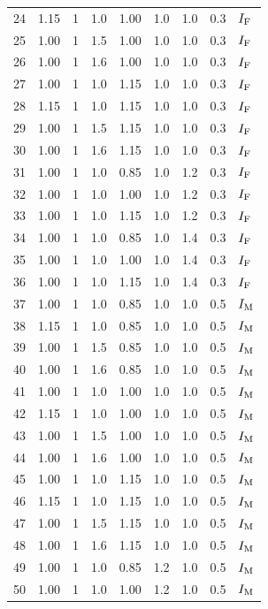 \begin{longtable}[t]{lllllllll}
24 & 1.15 & 1 & 1.0 & 1.00 & 1.0 & 1.0 & 0.3 & $I_{{\rm F}}$\\
25 & 1.00 & 1 & 1.5 & 1.00 & 1.0 & 1.0 & 0.3 & $I_{{\rm F}}$\\
26 & 1.00 & 1 & 1.6 & 1.00 & 1.0 & 1.0 & 0.3 & $I_{{\rm F}}$\\
27 & 1.00 & 1 & 1.0 & 1.15 & 1.0 & 1.0 & 0.3 & $I_{{\rm F}}$\\
28 & 1.15 & 1 & 1.0 & 1.15 & 1.0 & 1.0 & 0.3 & $I_{{\rm F}}$\\
29 & 1.00 & 1 & 1.5 & 1.15 & 1.0 & 1.0 & 0.3 & $I_{{\rm F}}$\\
30 & 1.00 & 1 & 1.6 & 1.15 & 1.0 & 1.0 & 0.3 & $I_{{\rm F}}$\\
31 & 1.00 & 1 & 1.0 & 0.85 & 1.0 & 1.2 & 0.3 & $I_{{\rm F}}$\\
32 & 1.00 & 1 & 1.0 & 1.00 & 1.0 & 1.2 & 0.3 & $I_{{\rm F}}$\\
33 & 1.00 & 1 & 1.0 & 1.15 & 1.0 & 1.2 & 0.3 & $I_{{\rm F}}$\\
34 & 1.00 & 1 & 1.0 & 0.85 & 1.0 & 1.4 & 0.3 & $I_{{\rm F}}$\\
35 & 1.00 & 1 & 1.0 & 1.00 & 1.0 & 1.4 & 0.3 & $I_{{\rm F}}$\\
36 & 1.00 & 1 & 1.0 & 1.15 & 1.0 & 1.4 & 0.3 & $I_{{\rm F}}$\\
37 & 1.00 & 1 & 1.0 & 0.85 & 1.0 & 1.0 & 0.5 & $I_{{\rm M}}$\\
38 & 1.15 & 1 & 1.0 & 0.85 & 1.0 & 1.0 & 0.5 & $I_{{\rm M}}$\\
39 & 1.00 & 1 & 1.5 & 0.85 & 1.0 & 1.0 & 0.5 & $I_{{\rm M}}$\\
40 & 1.00 & 1 & 1.6 & 0.85 & 1.0 & 1.0 & 0.5 & $I_{{\rm M}}$\\
41 & 1.00 & 1 & 1.0 & 1.00 & 1.0 & 1.0 & 0.5 & $I_{{\rm M}}$\\
42 & 1.15 & 1 & 1.0 & 1.00 & 1.0 & 1.0 & 0.5 & $I_{{\rm M}}$\\
43 & 1.00 & 1 & 1.5 & 1.00 & 1.0 & 1.0 & 0.5 & $I_{{\rm M}}$\\
44 & 1.00 & 1 & 1.6 & 1.00 & 1.0 & 1.0 & 0.5 & $I_{{\rm M}}$\\
45 & 1.00 & 1 & 1.0 & 1.15 & 1.0 & 1.0 & 0.5 & $I_{{\rm M}}$\\
46 & 1.15 & 1 & 1.0 & 1.15 & 1.0 & 1.0 & 0.5 & $I_{{\rm M}}$\\
47 & 1.00 & 1 & 1.5 & 1.15 & 1.0 & 1.0 & 0.5 & $I_{{\rm M}}$\\
48 & 1.00 & 1 & 1.6 & 1.15 & 1.0 & 1.0 & 0.5 & $I_{{\rm M}}$\\
49 & 1.00 & 1 & 1.0 & 0.85 & 1.2 & 1.0 & 0.5 & $I_{{\rm M}}$\\
50 & 1.00 & 1 & 1.0 & 1.00 & 1.2 & 1.0 & 0.5 & $I_{{\rm M}}$\\

\end{longtable}
